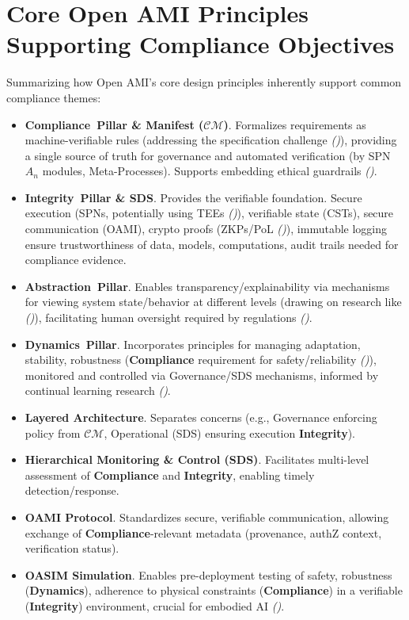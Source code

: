 \documentclass[12pt,a4paper]{report}
\renewcommand{\citep}[1]{\textit{\scriptsize{(\cite{#1})}}}
\newcommand{\Compliance}{\textbf{Compliance}}
\newcommand{\Integrity}{\textbf{Integrity}}
\newcommand{\Abstraction}{\textbf{Abstraction}}
\newcommand{\Dynamics}{\textbf{Dynamics}}
\begin{document}
	\section{Core Open AMI Principles Supporting Compliance Objectives}
	\label{app:compmap_core_principles}
	
	Summarizing how Open AMI's core design principles inherently support common compliance themes:
	
	\begin{itemize}
		\item \textbf{\Compliance\ Pillar \& Manifest ($\mathcal{CM}$)}. Formalizes requirements as machine-verifiable rules (addressing the specification challenge \citep{Kovac2025SpecGaming}), providing a single source of truth for governance and automated verification (by SPN $A_n$ modules, Meta-Processes). Supports embedding ethical guardrails \citep{Sekrst2024Guardrails}.
		\item \textbf{\Integrity\ Pillar \& SDS}. Provides the verifiable foundation. Secure execution (SPNs, potentially using TEEs \citep{Citadel_PlusPlus_2025}), verifiable state (CSTs), secure communication (OAMI), crypto proofs (ZKPs/PoL \citep{Peng2025ZKMLSurvey, Jia2021ProofOfLearning}), immutable logging ensure trustworthiness of data, models, computations, audit trails needed for compliance evidence.
		\item \textbf{\Abstraction\ Pillar}. Enables transparency/explainability via mechanisms for viewing system state/behavior at different levels (drawing on research like \citep{Anthropic_Decompose_2023}), facilitating human oversight required by regulations \citep{Crossing_Principle_Practice_Gap_2024}.
		\item \textbf{\Dynamics\ Pillar}. Incorporates principles for managing adaptation, stability, robustness (\textbf{Compliance} requirement for safety/reliability \citep{AdditionalCitationRef53}), monitored and controlled via Governance/SDS mechanisms, informed by continual learning research \citep{Wang2024ContinualLearningSurvey}.
		\item \textbf{Layered Architecture}. Separates concerns (e.g., Governance enforcing policy from $\mathcal{CM}$, Operational (SDS) ensuring execution \Integrity).
		\item \textbf{Hierarchical Monitoring \& Control (SDS)}. Facilitates multi-level assessment of \textbf{Compliance} and \Integrity, enabling timely detection/response.
		\item \textbf{OAMI Protocol}. Standardizes secure, verifiable communication, allowing exchange of \textbf{Compliance}-relevant metadata (provenance, authZ context, verification status).
		\item \textbf{OASIM Simulation}. Enables pre-deployment testing of safety, robustness (\Dynamics), adherence to physical constraints (\textbf{Compliance}) in a verifiable (\Integrity) environment, crucial for embodied AI \citep{Li2025DigitalTwins, Berg2025DigitalTwin}.
	\end{itemize}
	
\end{document}
